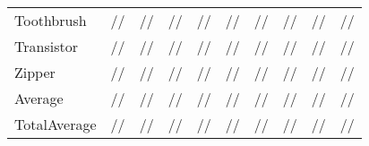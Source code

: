 \documentclass[lettersize,journal]{IEEEtran}
\begin{document}
\begin{table*}[htbp]
{\begin{tabular}{lccccccccc}
      Toothbrush   & //                                       & //                                                                          & //                                                  & //                                                                          & {\color{blue}{}}//                        & /{\color{blue}{}}/                   & //                                     & //{\color{blue}{}}                                                   & {\color{red}{}}/{\color{red}{}}/{\color{red}{}}    \\
      Transistor   & //                                       & //                                                                          & //                                                  & //                                                                          & //                                                 & //{\color{blue}{}}                   & //                                     & {\color{blue}{}}/{\color{blue}{}}/{\color{red}{}}  & {\color{red}{}}/{\color{red}{}}/{\color{red}{}}    \\
      Zipper       & //                                       & //                                                                          & //                                                  & //                                                                          & //                                                 & //                                            & //                                     & {\color{red}{}}/{\color{red}{}}/{\color{red}{}}    & {\color{blue}{}}/{\color{blue}{}}/{\color{blue}{}} \\\hline
      Average      & //                                       & //                                                                          & //                                                  & //                                                                          & //                                                 & //                                            & //                                     & {\color{blue}{}}/{\color{blue}{}}/{\color{blue}{}} & {\color{red}{}}/{\color{red}{}}/{\color{red}{}}    \\\hline
      TotalAverage & //                                       & //                                                                          & //                                                  & //                                                                          & //                                                 & //                                            & //                                     & {\color{blue}{}}/{\color{blue}{}}/{\color{red}{}}  & {\color{red}{}}/{\color{red}{}}/{\color{blue}{}}   \\
\bottomrule
    \end{tabular}
  }
\end{table*}
\end{document}
